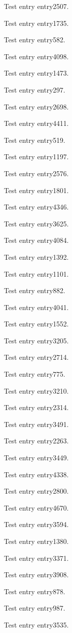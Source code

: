 Test entry \gls{entry2507}.

Test entry \gls{entry1735}.

Test entry \gls{entry582}.

Test entry \gls{entry4098}.

Test entry \gls{entry1473}.

Test entry \gls{entry297}.

Test entry \gls{entry2698}.

Test entry \gls{entry4411}.

Test entry \gls{entry519}.

Test entry \gls{entry1197}.

Test entry \gls{entry2576}.

Test entry \gls{entry1801}.

Test entry \gls{entry4346}.

Test entry \gls{entry3625}.

Test entry \gls{entry4084}.

Test entry \gls{entry1392}.

Test entry \gls{entry1101}.

Test entry \gls{entry882}.

Test entry \gls{entry4041}.

Test entry \gls{entry1552}.

Test entry \gls{entry3205}.

Test entry \gls{entry2714}.

Test entry \gls{entry775}.

Test entry \gls{entry3210}.

Test entry \gls{entry2314}.

Test entry \gls{entry3491}.

Test entry \gls{entry2263}.

Test entry \gls{entry3449}.

Test entry \gls{entry4338}.

Test entry \gls{entry2800}.

Test entry \gls{entry4670}.

Test entry \gls{entry3594}.

Test entry \gls{entry1380}.

Test entry \gls{entry3371}.

Test entry \gls{entry3908}.

Test entry \gls{entry878}.

Test entry \gls{entry987}.

Test entry \gls{entry3535}.

